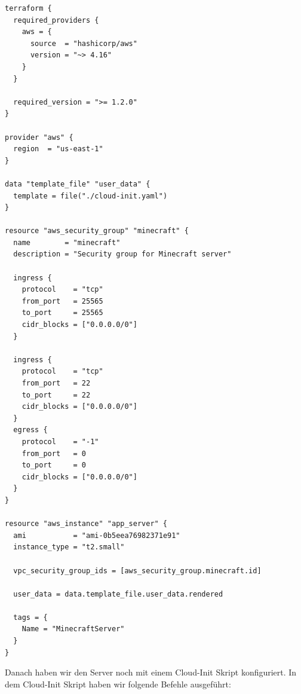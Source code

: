 \documentclass{article}
\begin{document}
\begin{lstlisting}[caption=Terraform Script für Minecraft Server]
terraform {
  required_providers {
    aws = {
      source  = "hashicorp/aws"
      version = "~> 4.16"
    }
  }

  required_version = ">= 1.2.0"
}

provider "aws" {
  region  = "us-east-1"
}

data "template_file" "user_data" {
  template = file("./cloud-init.yaml")
}

resource "aws_security_group" "minecraft" {
  name        = "minecraft"
  description = "Security group for Minecraft server"

  ingress {
    protocol    = "tcp"
    from_port   = 25565
    to_port     = 25565
    cidr_blocks = ["0.0.0.0/0"]
  }
  
  ingress {
    protocol    = "tcp"
    from_port   = 22
    to_port     = 22
    cidr_blocks = ["0.0.0.0/0"]
  }
  egress {
    protocol    = "-1"
    from_port   = 0
    to_port     = 0
    cidr_blocks = ["0.0.0.0/0"]
  }
}

resource "aws_instance" "app_server" {
  ami           = "ami-0b5eea76982371e91"
  instance_type = "t2.small"

  vpc_security_group_ids = [aws_security_group.minecraft.id]
  
  user_data = data.template_file.user_data.rendered

  tags = {
    Name = "MinecraftServer"
  }
}
\end{lstlisting}

\vspace{20pt}

\noindent Danach haben wir den Server noch mit einem Cloud-Init Skript konfiguriert. In dem Cloud-Init Skript haben wir folgende Befehle ausgeführt:
\end{document}
